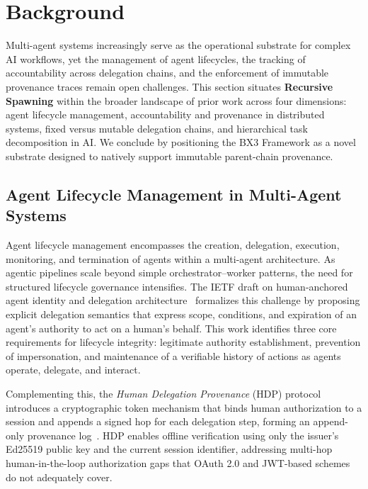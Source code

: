 \section{Background}
\label{sec:background}

Multi-agent systems increasingly serve as the operational substrate for complex AI workflows, yet the management of agent lifecycles, the tracking of accountability across delegation chains, and the enforcement of immutable provenance traces remain open challenges. This section situates \textbf{Recursive Spawning} within the broader landscape of prior work across four dimensions: agent lifecycle management, accountability and provenance in distributed systems, fixed versus mutable delegation chains, and hierarchical task decomposition in AI. We conclude by positioning the BX3 Framework as a novel substrate designed to natively support immutable parent-chain provenance.

\subsection{Agent Lifecycle Management in Multi-Agent Systems}
\label{sec:agent-lifecycle}

Agent lifecycle management encompasses the creation, delegation, execution, monitoring, and termination of agents within a multi-agent architecture. As agentic pipelines scale beyond simple orchestrator--worker patterns, the need for structured lifecycle governance intensifies. The IETF draft on human-anchored agent identity and delegation architecture~\cite{beyer2025agentidentity} formalizes this challenge by proposing explicit delegation semantics that express scope, conditions, and expiration of an agent's authority to act on a human's behalf. This work identifies three core requirements for lifecycle integrity: legitimate authority establishment, prevention of impersonation, and maintenance of a verifiable history of actions as agents operate, delegate, and interact.

Complementing this, the \textit{Human Delegation Provenance} (HDP) protocol introduces a cryptographic token mechanism that binds human authorization to a session and appends a signed hop for each delegation step, forming an append-only provenance log~\cite{ietf-hdp-2026}. HDP enables offline verification using only the issuer's Ed25519 public key and the current session identifier, addressing multi-hop human-in-the-loop authorization gaps that OAuth 2.0 and JWT-based schemes do not adequately cover.

